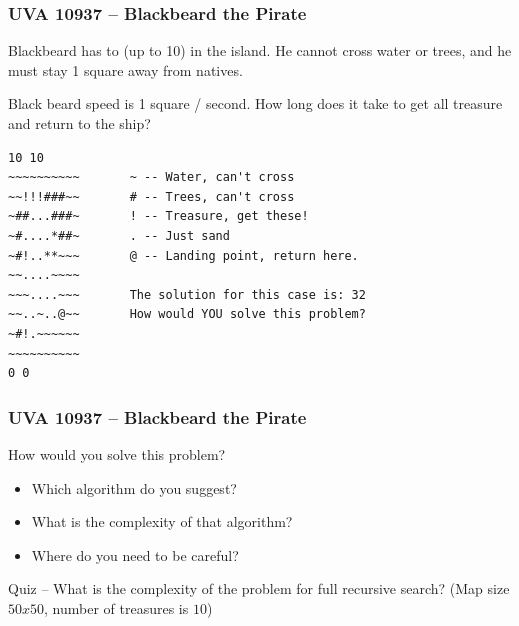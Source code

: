 \documentclass{beamer}
\begin{document}
\begin{frame}[fragile]
  \frametitle{UVA 10937 -- Blackbeard the Pirate}

  {\smaller

    \begin{block}{}
      Blackbeard has to  (up to 10)
      in the island. He \alert{cannot cross} water or trees, and he
      must stay 1 square away from natives.

      \medskip

      Black beard speed is 1 square / second. How long does it take
      to get all treasure and return to the ship?
    \end{block}
    
\begin{verbatim}
10 10
~~~~~~~~~~       ~ -- Water, can't cross
~~!!!###~~       # -- Trees, can't cross
~##...###~       ! -- Treasure, get these!
~#....*##~       . -- Just sand
~#!..**~~~       @ -- Landing point, return here.
~~....~~~~
~~~....~~~       The solution for this case is: 32
~~..~..@~~       How would YOU solve this problem?
~#!.~~~~~~
~~~~~~~~~~
0 0
\end{verbatim}
}
\end{frame}

\begin{frame}
  \frametitle{UVA 10937 -- Blackbeard the Pirate}

  How would you solve this problem?

  \vfill

  \begin{itemize}
  \item Which algorithm do you suggest?
    \bigskip
    
  \item What is the complexity of that algorithm?

    \bigskip
  \item Where do you need to be careful?
  \end{itemize}

  \bigskip

  \alert{Quiz} -- What is the complexity of the problem for full
  recursive search? (Map size $50x50$, number of treasures is $10$)
  
\end{frame}
\end{document}

